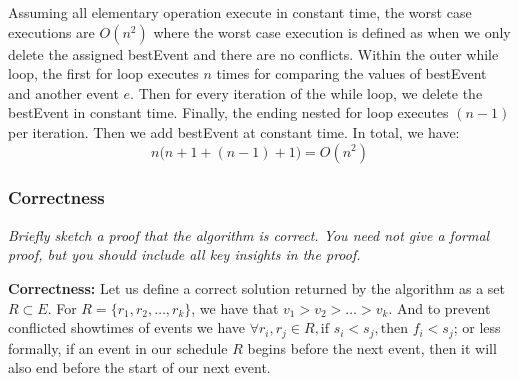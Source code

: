 \documentclass[11pt, oneside]{article}   	%
\theoremstyle{definition}
\theoremstyle{remark}
\begin{document}
Assuming all elementary operation execute in constant time, the worst case executions are $O(n^2)$ where the worst case execution is defined as when we only delete the assigned bestEvent and there are no conflicts.  Within the outer while loop, the first for loop executes $n$ times for comparing the values of bestEvent and another event $e$. Then for every iteration of the while loop, we delete the bestEvent in constant time. Finally, the ending nested for loop executes $(n-1)$ per iteration. Then we add bestEvent at constant time. In total, we have: $$n\big(n+1+(n-1)+1\big) = O(n^2)$$

\subsubsection{Correctness}
\textit{Briefly sketch a proof that the algorithm is correct. You need not give a formal proof, but you should include all key insights in the
proof.}

\textbf{Correctness:} Let us define a correct solution returned by the algorithm as a set $R \subset E$. For $R=\{r_1, r_2, \ldots, r_k\}$, we have that $v_1 > v_2 > \ldots > v_k$. And to prevent conflicted showtimes of events we have $ \forall r_i, r_j \in R, \text{if } s_i < s_j, \text{then } f_i < s_j$; or less formally, if an event in our schedule $R$ begins before the next event, then it will also end before the start of our next event.
\end{document}

